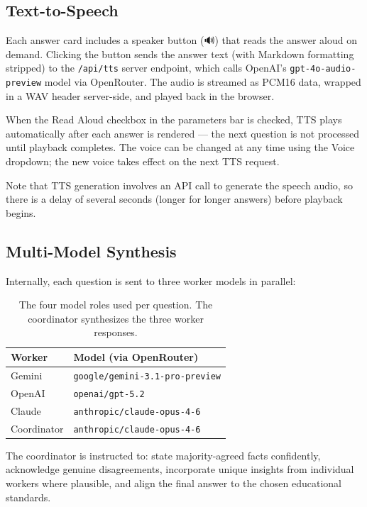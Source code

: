 \documentclass[11pt]{article}
\begin{document}
\subsection{Text-to-Speech}

Each answer card includes a speaker button (\textsf{🔊}) that reads the
answer aloud on demand. Clicking the button sends the answer text (with
Markdown formatting stripped) to the \texttt{/api/tts} server endpoint,
which calls OpenAI's \texttt{gpt-4o-audio-preview} model via OpenRouter.
The audio is streamed as PCM16 data, wrapped in a WAV header server-side,
and played back in the browser.

When the \textsf{Read Aloud} checkbox in the parameters bar is checked,
TTS plays automatically after each answer is rendered --- the next
question is not processed until playback completes. The voice can be
changed at any time using the \textsf{Voice} dropdown; the new voice
takes effect on the next TTS request.

Note that TTS generation involves an API call to generate the speech
audio, so there is a delay of several seconds (longer for longer answers)
before playback begins.

\subsection{Multi-Model Synthesis}

Internally, each question is sent to three worker models in parallel:

\begin{table}[h]
\centering
\begin{tabular}{ll}
\toprule
\textbf{Worker} & \textbf{Model (via OpenRouter)} \\
\midrule
Gemini  & \texttt{google/gemini-3.1-pro-preview} \\
OpenAI  & \texttt{openai/gpt-5.2} \\
Claude  & \texttt{anthropic/claude-opus-4-6} \\
\midrule
Coordinator & \texttt{anthropic/claude-opus-4-6} \\
\bottomrule
\end{tabular}
\caption{The four model roles used per question. The coordinator
synthesizes the three worker responses.}
\label{tab:models}
\end{table}

The coordinator is instructed to: state majority-agreed facts
confidently, acknowledge genuine disagreements, incorporate unique
insights from individual workers where plausible, and align the final
answer to the chosen educational standards.
\end{document}
